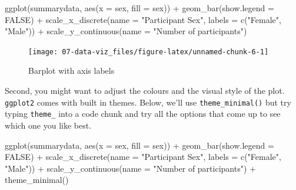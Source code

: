 \documentclass[
  oneside]{book}
\newenvironment{Shaded}{\begin{snugshade}}{\end{snugshade}}
\newcommand{\AttributeTok}[1]{\textcolor[rgb]{0.77,0.63,0.00}{#1}}
\newcommand{\ConstantTok}[1]{\textcolor[rgb]{0.00,0.00,0.00}{#1}}
\newcommand{\FunctionTok}[1]{\textcolor[rgb]{0.00,0.00,0.00}{#1}}
\newcommand{\NormalTok}[1]{#1}
\newcommand{\SpecialCharTok}[1]{\textcolor[rgb]{0.00,0.00,0.00}{#1}}
\newcommand{\StringTok}[1]{\textcolor[rgb]{0.31,0.60,0.02}{#1}}
\begin{document}
\begin{Shaded}
\begin{Highlighting}[]
\FunctionTok{ggplot}\NormalTok{(summarydata, }\FunctionTok{aes}\NormalTok{(}\AttributeTok{x =}\NormalTok{ sex, }\AttributeTok{fill =}\NormalTok{ sex)) }\SpecialCharTok{+}
  \FunctionTok{geom\_bar}\NormalTok{(}\AttributeTok{show.legend =} \ConstantTok{FALSE}\NormalTok{) }\SpecialCharTok{+}
  \FunctionTok{scale\_x\_discrete}\NormalTok{(}\AttributeTok{name =} \StringTok{"Participant Sex"}\NormalTok{, }
                   \AttributeTok{labels =} \FunctionTok{c}\NormalTok{(}\StringTok{"Female"}\NormalTok{, }\StringTok{"Male"}\NormalTok{)) }\SpecialCharTok{+}
  \FunctionTok{scale\_y\_continuous}\NormalTok{(}\AttributeTok{name =} \StringTok{"Number of participants"}\NormalTok{)}
\end{Highlighting}
\end{Shaded}

\begin{figure}

{\centering \texttt{[image: 07-data-viz\_files/figure-latex/unnamed-chunk-6-1]} 

}

\caption{Barplot with axis labels}\label{fig:unnamed-chunk-6}
\end{figure}

Second, you might want to adjust the colours and the visual style of the plot. \texttt{ggplot2} comes with built in themes. Below, we'll use \texttt{theme\_minimal()} but try typing \texttt{theme\_} into a code chunk and try all the options that come up to see which one you like best.

\begin{Shaded}
\begin{Highlighting}[]
\FunctionTok{ggplot}\NormalTok{(summarydata, }\FunctionTok{aes}\NormalTok{(}\AttributeTok{x =}\NormalTok{ sex, }\AttributeTok{fill =}\NormalTok{ sex)) }\SpecialCharTok{+}
  \FunctionTok{geom\_bar}\NormalTok{(}\AttributeTok{show.legend =} \ConstantTok{FALSE}\NormalTok{) }\SpecialCharTok{+}
  \FunctionTok{scale\_x\_discrete}\NormalTok{(}\AttributeTok{name =} \StringTok{"Participant Sex"}\NormalTok{, }
                   \AttributeTok{labels =} \FunctionTok{c}\NormalTok{(}\StringTok{"Female"}\NormalTok{, }\StringTok{"Male"}\NormalTok{)) }\SpecialCharTok{+}
  \FunctionTok{scale\_y\_continuous}\NormalTok{(}\AttributeTok{name =} \StringTok{"Number of participants"}\NormalTok{) }\SpecialCharTok{+}
  \FunctionTok{theme\_minimal}\NormalTok{()}
\end{Highlighting}
\end{Shaded}
\end{document}
